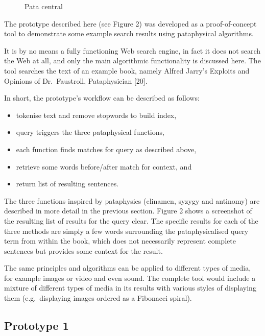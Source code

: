 \begin{figure}[htb] %
  \centering
  
\caption[Pata central]{Pata central}
\label{fig:patasearch01}
\end{figure}

The prototype described here (see Figure 2) was developed as a proof-of-concept tool to demonstrate some example search results using pataphysical algorithms.

It is by no means a fully functioning Web search engine, in fact it does not search the Web at all, and only the main algorithmic functionality is discussed here. The tool searches the text of an example book, namely Alfred Jarry’s Exploits and Opinions of Dr.\ Faustroll, Pataphysician [20].

In short, the prototype’s workflow can be described as follows:
\begin{itemize}
  \item tokenise text and remove stopwords to build index,
  \item query triggers the three pataphysical functions,
  \item each function finds matches for query as described above,
  \item retrieve some words before/after match for context, and
  \item return list of resulting sentences.
\end{itemize}

The three functions inspired by pataphysics (clinamen, syzygy and antinomy) are described in more detail in the previous section. Figure 2 shows a screenshot of the resulting list of results for the query clear. The specific results for each of the three methods are simply a few words surrounding the pataphysicalised query term from within the book, which does not necessarily represent complete sentences but provides some context for the result.

The same principles and algorithms can be applied to different types of media, for example images or video and even sound. The complete tool would include a mixture of different types of media in its results with various styles of displaying them (e.g.\ displaying images ordered as a Fibonacci spiral).

\subsection{Prototype 1}

